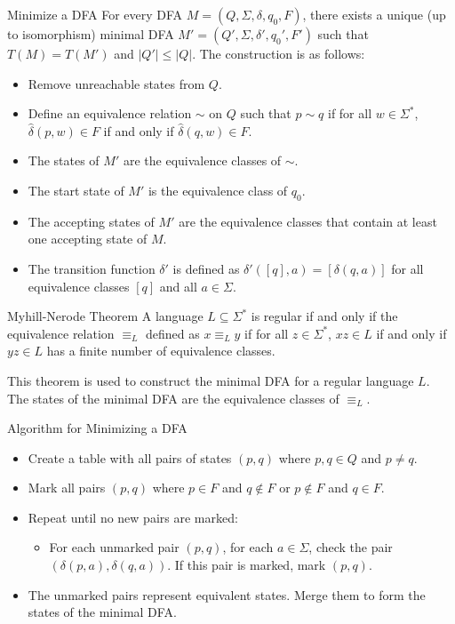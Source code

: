 \documentclass{beamer}
\begin{document}
\begin{frame}{Minimize a DFA}
    For every DFA $M=(Q,\Sigma,\delta,q_0,F)$, there exists a unique (up to isomorphism) minimal DFA $M'=(Q',\Sigma,\delta',q_0',F')$ such that $T(M)=T(M')$ and $|Q'|\leq |Q|$. The construction is as follows:
    \begin{itemize}
        \item Remove unreachable states from $Q$.
        \item Define an equivalence relation $\sim$ on $Q$ such that $p\sim q$ if for all $w\in \Sigma^*$, $\hat{\delta}(p,w)\in F$ if and only if $\hat{\delta}(q,w)\in F$.
        \item The states of $M'$ are the equivalence classes of $\sim$.
        \item The start state of $M'$ is the equivalence class of $q_0$.
        \item The accepting states of $M'$ are the equivalence classes that contain at least one accepting state of $M$.
        \item The transition function $\delta'$ is defined as $\delta'([q],a)=[\delta(q,a)]$ for all equivalence classes $[q]$ and all $a\in \Sigma$.
    \end{itemize}
\end{frame}
\begin{frame}{Myhill-Nerode Theorem}
    A language $L\subseteq \Sigma^*$ is regular if and only if the equivalence relation $\equiv_L$ defined as $x\equiv_L y$ if for all $z\in \Sigma^*$, $xz\in L$ if and only if $yz\in L$ has a finite number of equivalence classes.
    
    This theorem is used to construct the minimal DFA for a regular language $L$. The states of the minimal DFA are the equivalence classes of $\equiv_L$.
\end{frame} 

\begin{frame}{Algorithm for Minimizing a DFA}
    \begin{itemize}
        \item Create a table with all pairs of states $(p,q)$ where $p,q\in Q$ and $p\neq q$.
        \item Mark all pairs $(p,q)$ where $p\in F$ and $q\notin F$ or $p\notin F$ and $q\in F$.
        \item Repeat until no new pairs are marked:
        \begin{itemize}
            \item For each unmarked pair $(p,q)$, for each $a\in \Sigma$, check the pair $(\delta(p,a),\delta(q,a))$. If this pair is marked, mark $(p,q)$.
        \end{itemize}
        \item The unmarked pairs represent equivalent states. Merge them to form the states of the minimal DFA.
    \end{itemize}
\end{frame}
\end{document}
